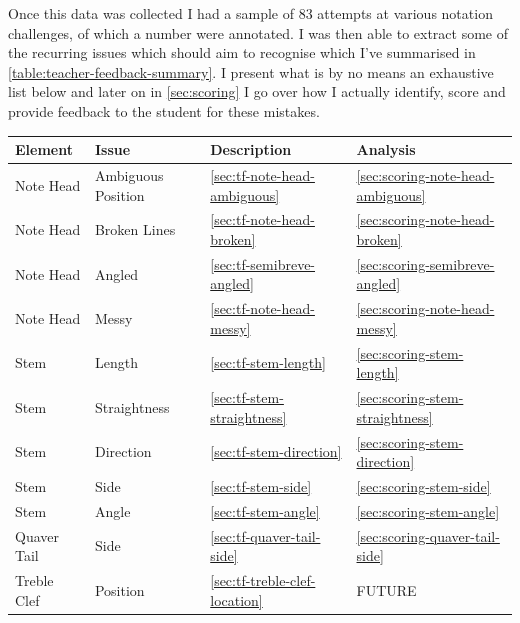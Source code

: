 Once this data was collected I had a sample of 83 attempts at various notation challenges, of which a number were annotated. I was then able to extract some of the recurring issues which \noteED should aim to recognise which I've summarised in \cref{table:teacher-feedback-summary}. I present what is by no means an exhaustive list below and later on in \cref{sec:scoring} I go over how I actually identify, score and provide feedback to the student for these mistakes.

\begin{table}[H]
    \centering
    \begin{tabularx}{\textwidth}{ llll }
        \toprule

        Element & Issue & Description & Analysis \\
        \midrule
        Note Head       & Ambiguous Position     & \cref{sec:tf-note-head-ambiguous}              & \cref{sec:scoring-note-head-ambiguous} \\
        Note Head       & Broken Lines           & \cref{sec:tf-note-head-broken}            & \cref{sec:scoring-note-head-broken} \\
        Note Head       & Angled                 & \cref{sec:tf-semibreve-angled}            & \cref{sec:scoring-semibreve-angled} \\
        Note Head       & Messy                  & \cref{sec:tf-note-head-messy}             & \cref{sec:scoring-note-head-messy} \\
        Stem            & Length                 & \cref{sec:tf-stem-length}                 & \cref{sec:scoring-stem-length} \\
        Stem            & Straightness           & \cref{sec:tf-stem-straightness}           & \cref{sec:scoring-stem-straightness} \\
        Stem            & Direction              & \cref{sec:tf-stem-direction}              & \cref{sec:scoring-stem-direction} \\
        Stem            & Side                   & \cref{sec:tf-stem-side}                   & \cref{sec:scoring-stem-side} \\
        Stem            & Angle                  & \cref{sec:tf-stem-angle}                  & \cref{sec:scoring-stem-angle} \\
        Quaver Tail     & Side                   & \cref{sec:tf-quaver-tail-side}            & \cref{sec:scoring-quaver-tail-side} \\
        Treble Clef     & Position               & \cref{sec:tf-treble-clef-location}        & FUTURE \\

\end{tabularx}
\end{table}
